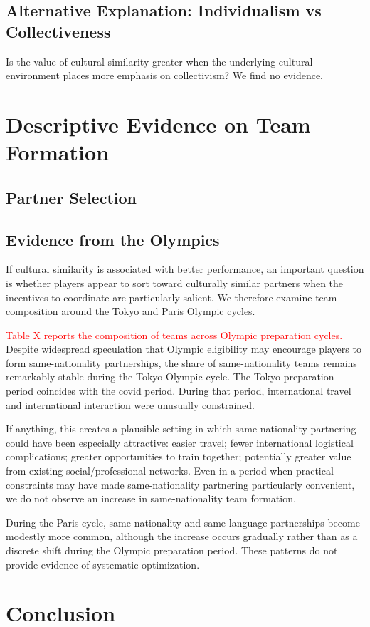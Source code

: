 \documentclass[10pt]{article}
\begin{document}
\subsection{Alternative Explanation: Individualism vs Collectiveness}
Is the value of cultural similarity greater when the underlying cultural environment places more emphasis on collectivism? We find no evidence.

 

\section{Descriptive Evidence on Team Formation}
\subsection{Partner Selection}
\subsection{Evidence from the Olympics}

If cultural similarity is associated with better performance, an important question is whether players appear to sort toward culturally similar partners when the incentives to coordinate are particularly salient. We therefore examine team composition around the Tokyo and Paris Olympic cycles.  

\textcolor{red}{Table X reports the composition of teams across Olympic preparation cycles.} Despite widespread speculation that Olympic eligibility may encourage players to form same-nationality partnerships, the share of same-nationality teams remains remarkably stable during the Tokyo Olympic cycle. The Tokyo preparation period coincides with the covid period. During that period, international travel and international interaction were unusually constrained.

If anything, this creates a plausible setting in which same-nationality partnering could have been especially attractive: easier travel; fewer international logistical complications; greater opportunities to train together; potentially greater value from existing social/professional networks. Even in a period when practical constraints may have made same-nationality partnering particularly convenient, we do not observe an increase in same-nationality team formation.


During the Paris cycle, same-nationality and same-language partnerships become modestly more common, although the increase occurs gradually rather than as a discrete shift during the Olympic preparation period. These patterns do not provide evidence of systematic optimization.


\section{Conclusion}
\end{document}
